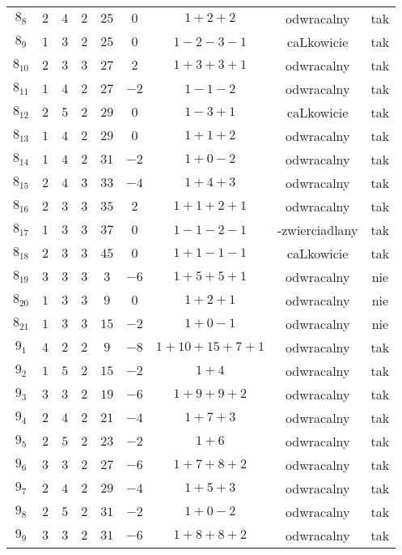 \begin{longtable}{ccccccccc}
$8_{8}$ & $2$ & $4$ & $2$ & $25$ & $0$ & $1+2+2$ & odwracalny & tak \\
$8_{9}$ & $1$ & $3$ & $2$ & $25$ & $0$ & $1-2-3-1$ & caLkowicie & tak \\
$8_{10}$ & $2$ & $3$ & $3$ & $27$ & $2$ & $1+3+3+1$ & odwracalny & tak \\
$8_{11}$ & $1$ & $4$ & $2$ & $27$ & $-2$ & $1-1-2$ & odwracalny & tak \\
$8_{12}$ & $2$ & $5$ & $2$ & $29$ & $0$ & $1-3+1$ & caLkowicie & tak \\
$8_{13}$ & $1$ & $4$ & $2$ & $29$ & $0$ & $1+1+2$ & odwracalny & tak \\
$8_{14}$ & $1$ & $4$ & $2$ & $31$ & $-2$ & $1+0-2$ & odwracalny & tak \\
$8_{15}$ & $2$ & $4$ & $3$ & $33$ & $-4$ & $1+4+3$ & odwracalny & tak \\
$8_{16}$ & $2$ & $3$ & $3$ & $35$ & $2$ & $1+1+2+1$ & odwracalny & tak \\
$8_{17}$ & $1$ & $3$ & $3$ & $37$ & $0$ & $1-1-2-1$ & -zwierciadlany & tak \\
$8_{18}$ & $2$ & $3$ & $3$ & $45$ & $0$ & $1+1-1-1$ & caLkowicie & tak \\
$8_{19}$ & $3$ & $3$ & $3$ & $3$ & $-6$ & $1+5+5+1$ & odwracalny & nie \\
$8_{20}$ & $1$ & $3$ & $3$ & $9$ & $0$ & $1+2+1$ & odwracalny & nie \\
$8_{21}$ & $1$ & $3$ & $3$ & $15$ & $-2$ & $1+0-1$ & odwracalny & nie \\
$9_{1}$ & $4$ & $2$ & $2$ & $9$ & $-8$ & $1+10+15+7+1$ & odwracalny & tak \\
$9_{2}$ & $1$ & $5$ & $2$ & $15$ & $-2$ & $1+4$ & odwracalny & tak \\
$9_{3}$ & $3$ & $3$ & $2$ & $19$ & $-6$ & $1+9+9+2$ & odwracalny & tak \\
$9_{4}$ & $2$ & $4$ & $2$ & $21$ & $-4$ & $1+7+3$ & odwracalny & tak \\
$9_{5}$ & $2$ & $5$ & $2$ & $23$ & $-2$ & $1+6$ & odwracalny & tak \\
$9_{6}$ & $3$ & $3$ & $2$ & $27$ & $-6$ & $1+7+8+2$ & odwracalny & tak \\
$9_{7}$ & $2$ & $4$ & $2$ & $29$ & $-4$ & $1+5+3$ & odwracalny & tak \\
$9_{8}$ & $2$ & $5$ & $2$ & $31$ & $-2$ & $1+0-2$ & odwracalny & tak \\
$9_{9}$ & $3$ & $3$ & $2$ & $31$ & $-6$ & $1+8+8+2$ & odwracalny & tak \\

\end{longtable}
